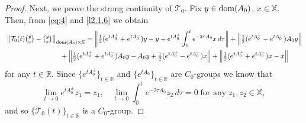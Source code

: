 \documentclass[10pt,a4paper]{amsart}
\newcommand{\RR}{{\mathbb R}}
\newcommand\bX{{\mathbb X}}
\newcommand\cT{{\mathcal T}}
\newcommand{\dom}{\text{\rm{dom}}}
\begin{document}
\begin{proof}
	Next, we prove the strong continuity of $\cT_0$. Fix $y\in\dom(A_0)$, $x\in \bX$. Then, from \eqref{eq:4} and \eqref{l2.1.6} we obtain 
	\begin{align}\label{2.1.14}
		&\left\|\cT_0(t)\tbinom{y}{x}-\tbinom{y}{x}\right\|_{\dom(A_0)\times\bX}=\left\|\tfrac{1}{2}(e^{tA_0^+}+e^{tA_0^-})y-y
		+e^{tA_0^+}\int_0^t e^{-2\tau A_0}x\,d\tau\right\|+\left\|\tfrac{1}{2}(e^{tA_0^+}-e^{tA_0^-})A_0 y\right\|
		\nonumber\\
		&\qquad\qquad\qquad\qquad+\left\|\tfrac{1}{2}(e^{tA_0^+}+e^{tA_0^-})A_0y-A_0y
		+\tfrac{1}{2}(e^{tA_0^+}-e^{tA_0^-})x\right\|   
		+\left\|\tfrac{1}{2}(e^{tA_0^+}+e^{tA_0^-})x-x\right\|
	\end{align}
	for any $t\in\RR$. Since $\{e^{tA_0^\pm}\}_{t\in\RR}$ and $\{e^{tA_0}\}_{t\in\RR}$ are $C_0$-groups we know that
	\begin{equation}\label{2.1.15}
		\lim_{t\to0}e^{tA_0^\pm}z_1=z_1,\quad\lim_{t\to0}\int_0^t e^{-2\tau A_0}z_2\,d\tau=0
		\;\mbox{for any}\;z_1,z_2\in\bX,
	\end{equation}
	and so $\{\cT_0(t)\}_{t\in\RR}$ is a $C_0$-group.
	

\end{proof}
\end{document}
